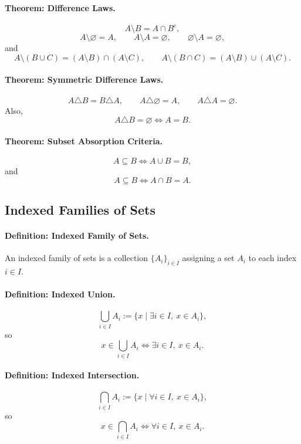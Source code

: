\paragraph{Theorem: Difference Laws.}
\[
  A\setminus B=A\cap B^c,
\]
\[
  A\setminus\varnothing=A,
  \qquad
  A\setminus A=\varnothing,
  \qquad
  \varnothing\setminus A=\varnothing,
\]
and
\[
  A\setminus(B\cup C)=(A\setminus B)\cap(A\setminus C),
  \qquad
  A\setminus(B\cap C)=(A\setminus B)\cup(A\setminus C).
\]

\paragraph{Theorem: Symmetric Difference Laws.}
\[
  A\triangle B=B\triangle A,
  \qquad
  A\triangle\varnothing=A,
  \qquad
  A\triangle A=\varnothing.
\]
Also,
\[
  A\triangle B=\varnothing\Longleftrightarrow A=B.
\]

\paragraph{Theorem: Subset Absorption Criteria.}
\[
  A\subseteq B
  \Longleftrightarrow
  A\cup B=B,
\]
and
\[
  A\subseteq B
  \Longleftrightarrow
  A\cap B=A.
\]

\subsection*{Indexed Families of Sets}

\paragraph{Definition: Indexed Family of Sets.}
An indexed family of sets is a collection \(\{A_i\}_{i\in I}\) assigning a set
\(A_i\) to each index \(i\in I\).

\paragraph{Definition: Indexed Union.}
\[
  \bigcup_{i\in I}A_i
  :=
  \{x\mid \exists i\in I,\ x\in A_i\},
\]
so
\[
  x\in\bigcup_{i\in I}A_i
  \Longleftrightarrow
  \exists i\in I,\ x\in A_i.
\]

\paragraph{Definition: Indexed Intersection.}
\[
  \bigcap_{i\in I}A_i
  :=
  \{x\mid \forall i\in I,\ x\in A_i\},
\]
so
\[
  x\in\bigcap_{i\in I}A_i
  \Longleftrightarrow
  \forall i\in I,\ x\in A_i.
\]

